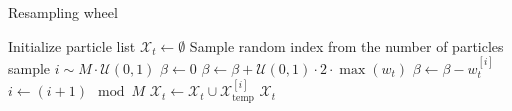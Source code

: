 \documentclass[11pt]{report}
\begin{document}
\begin{algorithm}
\caption{Resampling wheel}
\label{alg:resampling_wheel}
  \begin{algorithmic}[1]
    \LineComment Initialize particle list
    \State $\mathcal{X}_t \gets \emptyset$
    \LineComment Sample random index from the number of particles
    \State sample $i \sim M \cdot \mathcal{U}(0, 1)$
    \State $\beta \gets 0$
    \State $\beta \gets \beta + \mathcal{U}(0, 1)\cdot 2\cdot \max(w_t)$
    \State $\beta \gets \beta - w_t^{[i]}$
    \State $i \gets (i + 1) \mod M$
    \EndWhile
    \State $\mathcal{X}_t \gets \mathcal{X}_t \cup \mathcal{X}_{\text{temp}}^{[i]}$
    \EndFor
  \State \Return $\mathcal{X}_t$
\EndProcedure
\end{algorithmic}
\end{algorithm}

\end{document}
